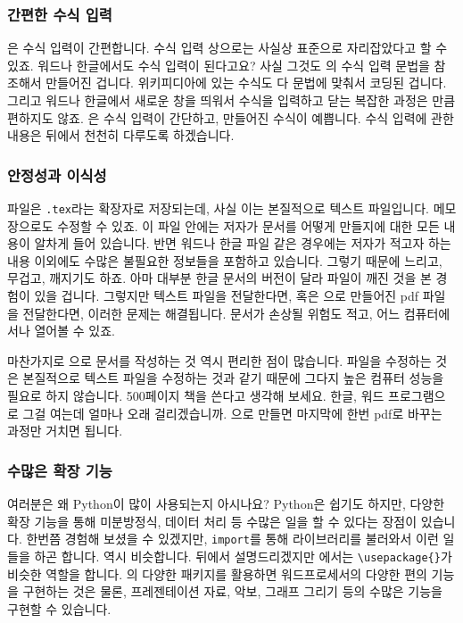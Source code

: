 \subsubsection{간편한 수식 입력}
\label{sec:1.2-math}

\lt 은 수식 입력이 간편합니다.
수식 입력 상으로는 사실상 표준으로 자리잡았다고 할 수 있죠.
워드나 한글에서도 수식 입력이 된다고요?
사실 그것도 \lt 의 수식 입력 문법을 참조해서 만들어진 겁니다.
위키피디아에 있는 수식도 다 \lt 문법에 맞춰서 코딩된 겁니다.
그리고 워드나 한글에서 새로운 창을 띄워서 수식을 입력하고 닫는 복잡한 과정은 \lt 만큼 편하지도 않죠.
\lt 은 수식 입력이 간단하고, 만들어진 수식이 예쁩니다.
수식 입력에 관한 내용은 뒤에서 천천히 다루도록 하겠습니다.%

\subsubsection{안정성과 이식성}
\label{sec:1.2-steady}

\lt 파일은 \verb|.tex|라는 확장자로 저장되는데, 사실 이는 본질적으로 텍스트 파일입니다.
메모장으로도 수정할 수 있죠.
이 파일 안에는 저자가 문서를 어떻게 만들지에 대한 모든 내용이 알차게 들어 있습니다.
반면 워드나 한글 파일 같은 경우에는 저자가 적고자 하는 내용 이외에도 수많은 불필요한 정보들을 포함하고 있습니다. 그렇기 때문에 느리고, 무겁고, 깨지기도 하죠.
아마 대부분 한글 문서의 버전이 달라 파일이 깨진 것을 본 경험이 있을 겁니다.
그렇지만 텍스트 파일을 전달한다면, 혹은 \lt 으로 만들어진 pdf 파일을 전달한다면, 이러한 문제는 해결됩니다. 문서가 손상될 위험도 적고, 어느 컴퓨터에서나 열어볼 수 있죠.

마찬가지로 \lt 으로 문서를 작성하는 것 역시 편리한 점이 많습니다.
\lt 파일을 수정하는 것은 본질적으로 텍스트 파일을 수정하는 것과 같기 때문에 그다지 높은 컴퓨터 성능을 필요로 하지 않습니다.
500페이지 책을 쓴다고 생각해 보세요.
한글, 워드 프로그램으로 그걸 여는데 얼마나 오래 걸리겠습니까.
\lt 으로 만들면 마지막에 한번 pdf로 바꾸는 과정만 거치면 됩니다.

\subsubsection{수많은 확장 기능}
\label{sec:1.2-ext}

여러분은 왜 Python이 많이 사용되는지 아시나요?
Python은 쉽기도 하지만, 다양한 확장 기능을 통해 미분방정식, 데이터 처리 등 수많은 일을 할 수 있다는 장점이 있습니다.
한번쯤 경험해 보셨을 수 있겠지만, \verb|import|를 통해 라이브러리를 불러와서 이런 일들을 하곤 합니다.
\lt 역시 비슷합니다.
뒤에서 설명드리겠지만 \lt 에서는 \verb|\usepackage{}|가 비슷한 역할을 합니다.
\lt 의 다양한 패키지를 활용하면 워드프로세서의 다양한 편의 기능을 구현하는 것은 물론, 프레젠테이션 자료, 악보, 그래프 그리기 등의 수많은 기능을 구현할 수 있습니다. 

